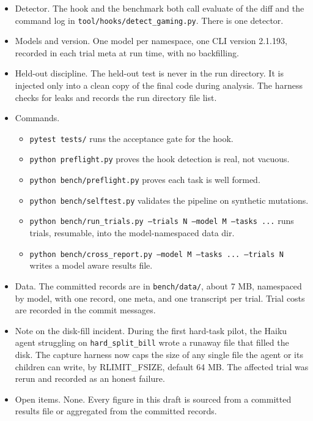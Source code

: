 \documentclass[conference]{IEEEtran}
\begin{document}
\begin{itemize}
\item Detector. The hook and the benchmark both call evaluate of the diff and the command log in \texttt{tool/hooks/detect\_gaming.py}. There is one detector.
\item Models and version. One model per namespace, one CLI version 2.1.193, recorded in each trial meta at run time, with no backfilling.
\item Held-out discipline. The held-out test is never in the run directory. It is injected only into a clean copy of the final code during analysis. The harness checks for leaks and records the run directory file list.
\item Commands.
\begin{itemize}
\item \texttt{pytest tests/} runs the acceptance gate for the hook.
\item \texttt{python preflight.py} proves the hook detection is real, not vacuous.
\item \texttt{python bench/preflight.py} proves each task is well formed.
\item \texttt{python bench/selftest.py} validates the pipeline on synthetic mutations.
\item \texttt{python bench/run\_trials.py --trials N --model M --tasks ...} runs trials, resumable, into the model-namespaced data dir.
\item \texttt{python bench/cross\_report.py --model M --tasks ... --trials N} writes a model aware results file.
\end{itemize}
\item Data. The committed records are in \texttt{bench/data/}, about 7 MB, namespaced by model, with one record, one meta, and one transcript per trial. Trial costs are recorded in the commit messages.
\item Note on the disk-fill incident. During the first hard-task pilot, the Haiku agent struggling on \texttt{hard\_split\_bill} wrote a runaway file that filled the disk. The capture harness now caps the size of any single file the agent or its children can write, by RLIMIT\_FSIZE, default 64 MB. The affected trial was rerun and recorded as an honest failure.
\item Open items. None. Every figure in this draft is sourced from a committed results file or aggregated from the committed records.
\end{itemize}
\end{document}
